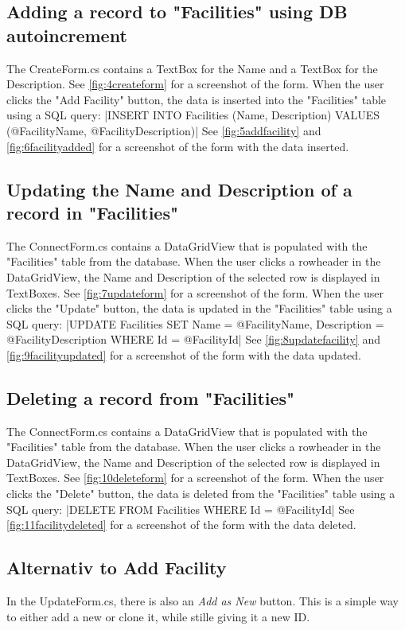 \subsection{Adding a record to "Facilities" using DB autoincrement}
The CreateForm.cs contains a TextBox for the Name and a TextBox for the Description. See \ref*{fig:4createform} for a screenshot of the form.
When the user clicks the "Add Facility" button, the data is inserted into the "Facilities" table using a SQL query:
|INSERT INTO Facilities (Name, Description) VALUES (@FacilityName, @FacilityDescription)|
See \ref*{fig:5addfacility} and \ref*{fig:6facilityadded} for a screenshot of the form with the data inserted.

\subsection{Updating the Name and Description of a record in "Facilities"}
The ConnectForm.cs contains a DataGridView that is populated with the "Facilities" table from the database. 
When the user clicks a rowheader in the DataGridView, the Name and Description of the selected row is displayed in TextBoxes.
See \ref*{fig:7updateform} for a screenshot of the form. When the user clicks the "Update" button, the data is updated in the "Facilities" table using a SQL query:
|UPDATE Facilities SET Name = @FacilityName, Description = @FacilityDescription WHERE Id = @FacilityId|
See \ref*{fig:8updatefacility} and \ref*{fig:9facilityupdated} for a screenshot of the form with the data updated.

\subsection{Deleting a record from "Facilities"}
The ConnectForm.cs contains a DataGridView that is populated with the "Facilities" table from the database. 
When the user clicks a rowheader in the DataGridView, the Name and Description of the selected row is displayed in TextBoxes.
See \ref*{fig:10deleteform} for a screenshot of the form. When the user clicks the "Delete" button, the data is deleted from the "Facilities" table using a SQL query:
|DELETE FROM Facilities WHERE Id = @FacilityId|
See \ref*{fig:11facilitydeleted} for a screenshot of the form with the data deleted.

\subsection{Alternativ to Add Facility}
In the UpdateForm.cs, there is also an \emph{Add as New} button. This is a simple way to either add a new or clone it, while stille giving it a new ID.